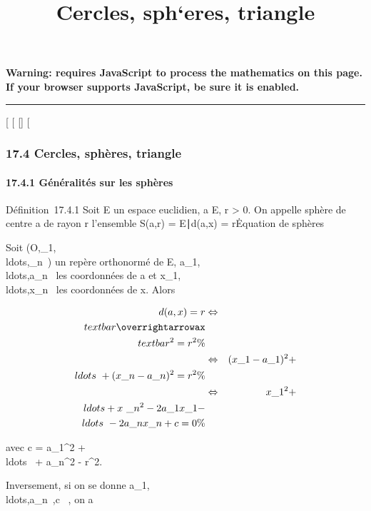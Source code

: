 \documentclass[]{article}
\title{Cercles, sph`eres, triangle}
\author{}
\date{}
\begin{document}
\maketitle

\textbf{Warning: 
requires JavaScript to process the mathematics on this page.\\ If your
browser supports JavaScript, be sure it is enabled.}

\begin{center}\rule{3in}{0.4pt}\end{center}

{[}
{[}
{[}{]}
{[}

\subsubsection{17.4 Cercles, sphères, triangle}

\paragraph{17.4.1 Généralités sur les sphères}

Définition~17.4.1 Soit E un espace euclidien, a \in E, r \textgreater{} 0.
On appelle sphère de centre a de rayon r l'ensemble S(a,r) =
\x \in E∣d(a,x) =
r\.

Equation de sphères

Soit
(O,\vece\_1,\\ldots,\vece\_n~)
un repère orthonormé de E,
a\_1,\\ldots,a\_n~
les coordonnées de a et
x\_1,\\ldots,x\_n~
les coordonnées de x. Alors

\begin{align*} d(a,x) = r&
\Leftrightarrow &
\\textbar{}\overrightarrowax\\textbar{}^2
= r^2 \%& \\ &
\Leftrightarrow & (x\_1 -
a\_1)^2 +
\\ldots~ +
(x\_ n - a\_n)^2 = r^2 \%&
\\ & \Leftrightarrow &
x\_1^2 +
\\ldots + x~\_
n^2 - 2a\_ 1x\_1
-\\ldots~ -
2a\_nx\_n + c = 0\%& \\
\end{align*}

avec c = a\_1^2 +
\\ldots~ +
a\_n^2 - r^2.

Inversement, si on se donne
a\_1,\\ldots,a\_n~,c
\in {}~, on a
\end{document}
